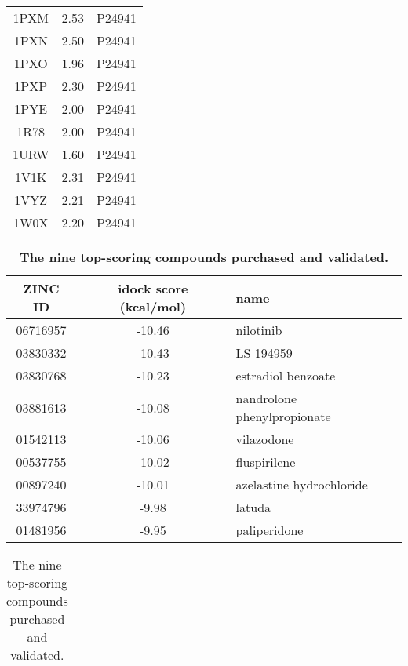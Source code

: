 \documentclass[10pt]{article}
\begin{document}
\begin{table}[!ht]
\begin{tabular}{ccc}
1PXM & 2.53 & P24941\\
1PXN & 2.50 & P24941\\
1PXO & 1.96 & P24941\\
1PXP & 2.30 & P24941\\
1PYE & 2.00 & P24941\\
1R78 & 2.00 & P24941\\
1URW & 1.60 & P24941\\
1V1K & 2.31 & P24941\\
1VYZ & 2.21 & P24941\\
1W0X & 2.20 & P24941\\
\end{tabular}
\begin{flushleft}\label{PDBs}
\end{flushleft}
\end{table}

\begin{table}[!ht]
\caption{
\bf{The nine top-scoring compounds purchased and validated.}}
\begin{tabular}{ccl}
\hline
ZINC ID & idock score (kcal/mol) & name\\
\hline
06716957 & -10.46 & nilotinib\\
03830332 & -10.43 & LS-194959\\
03830768 & -10.23 & estradiol benzoate\\
03881613 & -10.08 & nandrolone phenylpropionate\\
01542113 & -10.06 & vilazodone\\
00537755 & -10.02 & fluspirilene\\
00897240 & -10.01 & azelastine hydrochloride\\
33974796 &  -9.98 & latuda\\
01481956 &  -9.95 & paliperidone\\
\hline
\end{tabular}
\begin{flushleft}\label{Top9}
\end{flushleft}
\end{table}

\begin{table}
\caption{The nine top-scoring compounds purchased and validated.}
\label{Top9}
\begin{tabular}{ccl}
\hline
\hline
\end{tabular}
\end{table}

\end{document}
